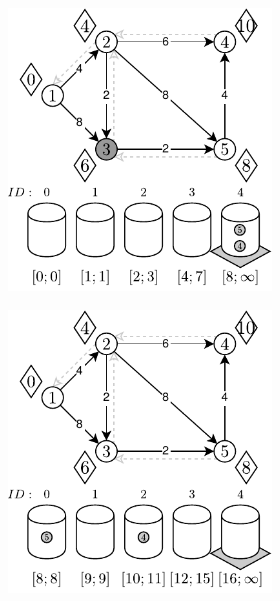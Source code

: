 \begin{figure}[!ht]
\begin{subfigure}[b]{\textwidth}
\begin{subfigure}[b]{0.32\textwidth}
			\includegraphics[width=\textwidth]{Chapter_II/RADIX-HEAP-C-Example/d.pdf}
			\caption{}
			\label{fig:exampleRadixHeapC:d}
		\end{subfigure}
		\hfill
		\begin{subfigure}[b]{0.32\textwidth}
			\includegraphics[width=\textwidth]{Chapter_II/RADIX-HEAP-C-Example/e.pdf}

\end{subfigure}
\end{subfigure}
\end{figure}
